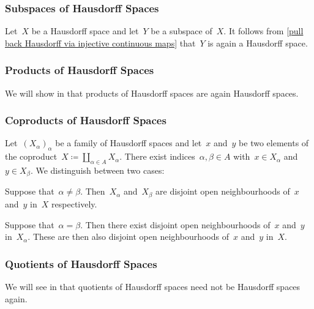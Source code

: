 \subsubsection{Subspaces of Hausdorff Spaces}

Let~$X$ be a Hausdorff space and let~$Y$ be a subspace of~$X$.
It follows from \cref{pull back Hausdorff via injective continuous maps} that~$Y$ is again a Hausdorff space.



\subsubsection{Products of Hausdorff Spaces}

We will show in  that products of Hausdorff spaces are again Hausdorff spaces.



\subsubsection{Coproducts of Hausdorff Spaces}

Let~$(X_α)_α$ be a family of Hausdorff spaces and let~$x$ and~$y$ be two elements of the coproduct~$X ≔ ∐_{α ∈ A} X_α$.
There exist indices~$α, β ∈ A$ with~$x ∈ X_α$ and~$y ∈ X_β$.
We distinguish between two cases:

\begin{casedistinction}

	\item
		Suppose that~$α ≠ β$.
		Then~$X_α$ and~$X_β$ are disjoint open neighbourhoods of~$x$ and~$y$ in~$X$ respectively.

	\item
		Suppose that~$α = β$.
		Then there exist disjoint open neighbourhoods of~$x$ and~$y$ in~$X_α$.
		These are then also disjoint open neighbourhoods of~$x$ and~$y$ in~$X$.

\end{casedistinction}



\subsubsection{Quotients of Hausdorff Spaces}

We will see in  that quotients of Hausdorff spaces need not be Hausdorff spaces again.
